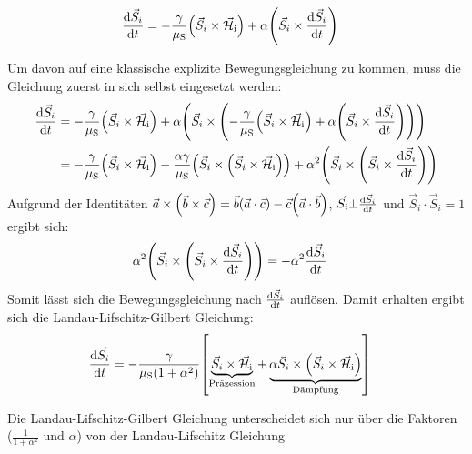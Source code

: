 \documentclass[main.tex]{subfiles}
\begin{document}
\begin{align}
	\dv{\vec{S}_i}{t} & = -\frac{\gamma }{\mu_{\text{S}}}\qty(\vec{S}_i \times \vec{\mathcal{H}}_{\text{i}}) 
	+ \alpha \qty(\vec{S}_i \times \dv{\vec{S}_i}{t})
\end{align}

Um davon auf eine klassische explizite Bewegungsgleichung zu kommen, muss die
Gleichung zuerst in sich selbst eingesetzt werden:
\begin{align}
	\dv{\vec{S}_i}{t} & = -\frac{\gamma }{\mu_{\text{S}}}\qty(\vec{S}_i
	\times
	\vec{\mathcal{H}}_{\text{i}}) + \alpha \qty(\vec{S}_i \times
	\qty(-\frac{\gamma }{\mu_{\text{S}}}\qty(\vec{S}_i
		\times
		\vec{\mathcal{H}}_{\text{i}}) + \alpha \qty(\vec{S}_i \times
	\dv{\vec{S}_i}{t})))                                                \\
	                  & = -\frac{\gamma }{\mu_{\text{S}}}\qty(\vec{S}_i
	\times
	\vec{\mathcal{H}}_{\text{i}}) - \frac{\alpha\gamma}{\mu_\text{S}}
	\qty(\vec{S}_i \times \qty(\vec{S}_i \times
		\vec{\mathcal{H}}_{\text{i}})) +
	\alpha^2 \qty(\vec{S}_i \times \qty(\vec{S}_i \times
		\dv{\vec{S}_i}{t}))
\end{align}
Aufgrund der Identitäten \(\vec{a} \times \qty(\vec{b} \times \vec{c}) =
\vec{b} \qty(\vec{a} \cdot \vec{c}) - \vec{c} \qty(\vec{a} \cdot \vec{b})\),
\(\vec{S}_i \bot \dv{\vec{S}_i}{t}\) und \(\vec{S}_i \cdot \vec{S}_i = 1\)
ergibt sich:
\begin{align}
	\alpha^2 \qty(\vec{S}_i \times \qty(\vec{S}_i \times
	\dv{\vec{S}_i}{t})) & = -\alpha^2\dv{\vec{S}_i}{t}
\end{align}
Somit lässt sich die Bewegungsgleichung nach \(\dv{\vec{S}_i}{t}\) auflösen.
Damit erhalten ergibt sich die Landau-Lifschitz-Gilbert Gleichung:
\begin{align}
	\dv{\vec{S}_i}{t} & = -\frac{\gamma
	}{\mu_{\text{S}}(1+\alpha^2)}\qty[\underbrace{\vec{S}_i \times
			\vec{\mathcal{H}}_{\text{i}}}_\text{Präzession} +
		\underbrace{\alpha \vec{S}_i
			\times
			\qty(\vec{S}_i \times
			\vec{\mathcal{H}}_{\text{i}})}_\text{Dämpfung}]\label{eq:llg}
\end{align}

Die Landau-Lifschitz-Gilbert Gleichung unterscheidet sich nur über die Faktoren
(\(\frac{1
}{1 + \alpha^2}\) und \(\alpha\)) von der Landau-Lifschitz Gleichung
\end{document}
